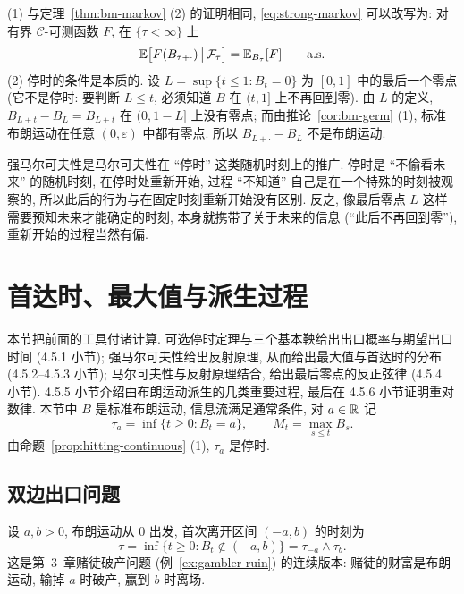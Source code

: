 \begin{remark}
(1) 与定理~\ref{thm:bm-markov} (2) 的证明相同, \eqref{eq:strong-markov} 可以改写为: 对有界 $\mathcal{C}$-可测函数 $F$, 在 $\{\tau<\infty\}$ 上
\[
\mathbb{E}\big[F(B_{\tau+\cdot})\,\big|\,\mathcal{F}_\tau\big]=\mathbb{E}_{B_\tau}[F]\qquad\text{a.s.}
\]
(2) 停时的条件是本质的. 设 $L=\sup\{t\le1: B_t=0\}$ 为 $[0,1]$ 中的最后一个零点 (它不是停时: 要判断 $L\le t$, 必须知道 $B$ 在 $(t,1]$ 上不再回到零). 由 $L$ 的定义, $B_{L+t}-B_L=B_{L+t}$ 在 $(0,1-L]$ 上没有零点; 而由推论~\ref{cor:bm-germ} (1), 标准布朗运动在任意 $(0,\varepsilon)$ 中都有零点. 所以 $B_{L+\cdot}-B_L$ 不是布朗运动.
\end{remark}

\begin{intuition}
强马尔可夫性是马尔可夫性在 ``停时'' 这类随机时刻上的推广. 停时是 ``不偷看未来'' 的随机时刻, 在停时处重新开始, 过程 ``不知道'' 自己是在一个特殊的时刻被观察的, 所以此后的行为与在固定时刻重新开始没有区别. 反之, 像最后零点 $L$ 这样需要预知未来才能确定的时刻, 本身就携带了关于未来的信息 (``此后不再回到零''), 重新开始的过程当然有偏.
\end{intuition}

\section{首达时、最大值与派生过程}
\label{sec:4-5}

本节把前面的工具付诸计算. 可选停时定理与三个基本鞅给出出口概率与期望出口时间 (4.5.1 小节); 强马尔可夫性给出反射原理, 从而给出最大值与首达时的分布 (4.5.2--4.5.3 小节); 马尔可夫性与反射原理结合, 给出最后零点的反正弦律 (4.5.4 小节). 4.5.5 小节介绍由布朗运动派生的几类重要过程, 最后在 4.5.6 小节证明重对数律. 本节中 $B$ 是标准布朗运动, 信息流满足通常条件, 对 $a\in\mathbb{R}$ 记
\[
\tau_a=\inf\{t\ge0: B_t=a\},\qquad M_t=\max_{s\le t}B_s.
\]
由命题~\ref{prop:hitting-continuous} (1), $\tau_a$ 是停时.

\subsection{双边出口问题}

设 $a,b>0$, 布朗运动从 $0$ 出发, 首次离开区间 $(-a,b)$ 的时刻为
\[
\tau=\inf\{t\ge0: B_t\notin(-a,b)\}=\tau_{-a}\wedge\tau_b.
\]
这是第~3~章赌徒破产问题 (例~\ref{ex:gambler-ruin}) 的连续版本: 赌徒的财富是布朗运动, 输掉 $a$ 时破产, 赢到 $b$ 时离场.

